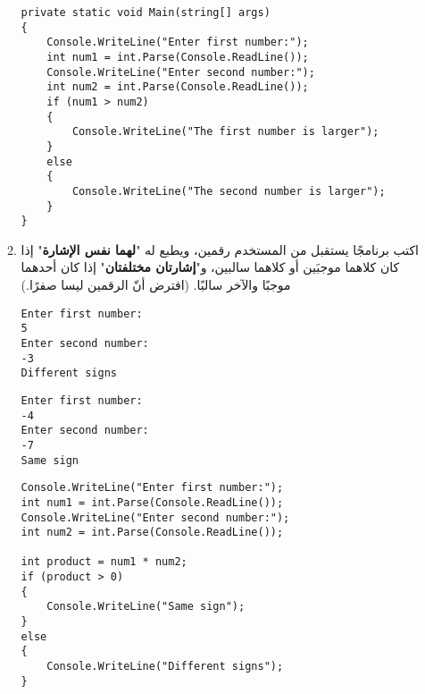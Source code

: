 \documentclass[12pt, twoside]{article}
\begin{document}
\begin{enumerate}[itemsep=3em]
\begin{enumerate}
\ifwithsols
\begin{boxSolution}
\begin{english}
\begin{verbatim}
private static void Main(string[] args)
{
    Console.WriteLine("Enter first number:");
    int num1 = int.Parse(Console.ReadLine());
    Console.WriteLine("Enter second number:");
    int num2 = int.Parse(Console.ReadLine());
    if (num1 > num2)
    {
        Console.WriteLine("The first number is larger");
    }
    else
    {
        Console.WriteLine("The second number is larger");
    }
}
\end{verbatim}
\end{english}
\end{boxSolution}
\fi
\clearpage
\fi

\item
اكتب برنامجًا يستقبل من المستخدم رقمين، ويطبع له "\textbf{لهما نفس الإشارة}" إذا كان كلاهما موجبَين أو كلاهما سالبين، و"\textbf{إشارتان مختلفتان}" إذا كان أحدهما موجبًا والآخر سالبًا.
(افترض أنّ الرقمين ليسا صفرًا.)
\ifdetailed
\begin{boxExample}[1]
\begin{english}
\begin{verbatim}
Enter first number:
5
Enter second number:
-3
Different signs
\end{verbatim}
\end{english}
\end{boxExample}
\begin{boxExample}[2]
\begin{english}
\begin{verbatim}
Enter first number:
-4
Enter second number:
-7
Same sign
\end{verbatim}
\end{english}
\end{boxExample}

\ifwithsols
\begin{boxSolution}
\begin{english}
\begin{verbatim}
Console.WriteLine("Enter first number:");
int num1 = int.Parse(Console.ReadLine());
Console.WriteLine("Enter second number:");
int num2 = int.Parse(Console.ReadLine());

int product = num1 * num2;
if (product > 0)
{
    Console.WriteLine("Same sign");
}
else
{
    Console.WriteLine("Different signs");
}
\end{verbatim}
\end{english}
\end{boxSolution}
\fi
\clearpage
\fi


\end{enumerate}
\end{enumerate}
\end{document}
